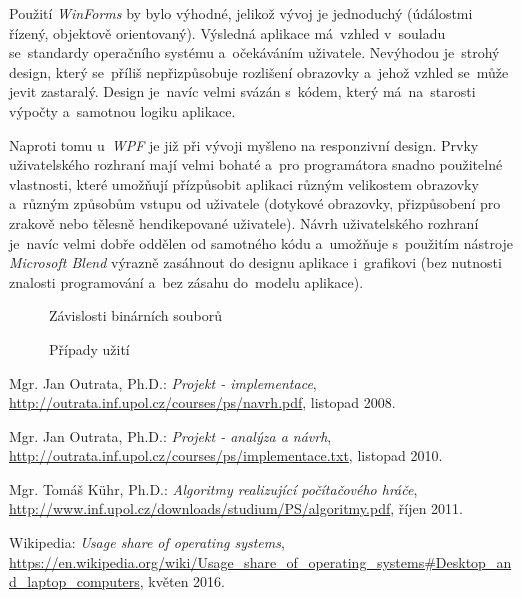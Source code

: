 \documentclass[12pt]{article}
\begin{document}
Použití \emph{WinForms} by bylo výhodné, jelikož vývoj je jednoduchý (údálostmi řízený, objektově orientovaný). Výsledná aplikace má~vzhled v~souladu se~standardy operačního systému a~očekáváním uživatele. Nevýhodou je~strohý design, který se~příliš nepřizpůsobuje rozlišení obrazovky a~jehož vzhled se~může jevit zastaralý. Design je~navíc velmi svázán s~kódem, který má~na~starosti výpočty a~samotnou logiku aplikace.

Naproti tomu u~\emph{WPF} je již při vývoji myšleno na responzivní design. Prvky uživatelského rozhraní mají velmi bohaté a~pro programátora snadno použitelné vlastnosti, které umožňují přízpůsobit aplikaci různým velikostem obrazovky a~různým způsobům vstupu od uživatele (dotykové obrazovky, přizpůsobení pro zrakově nebo tělesně hendikepované uživatele). Návrh uživatelského rozhraní je~navíc velmi dobře oddělen od samotného kódu a~umožňuje s~použitím nástroje \emph{Microsoft Blend} výrazně zasáhnout do designu aplikace i~grafikovi (bez nutnosti znalosti programování a~bez zásahu do~modelu aplikace).

\begin{figure}[ht]
	\epsfysize=60mm
	\caption{Závislosti binárních souborů}
	\label{Assemblies}
\end{figure}

\begin{figure}[ht]
	\epsfysize=200mm
	\caption{Případy užití}
	\label{PrimaryUseCases}
\end{figure}

\newpage
\begin{thebibliography}{10}

	
 Mgr. Jan Outrata, Ph.D.: \emph{Projekt - implementace},
 \url{http://outrata.inf.upol.cz/courses/ps/navrh.pdf},
			listopad 2008.

	
 Mgr. Jan Outrata, Ph.D.: \emph{Projekt - analýza a návrh},
 \url{http://outrata.inf.upol.cz/courses/ps/implementace.txt},
			listopad 2010.

 Mgr. Tomáš Kühr, Ph.D.: \emph{Algoritmy realizující počítačového hráče},
 \url{http://www.inf.upol.cz/downloads/studium/PS/algoritmy.pdf},
			říjen 2011.

Wikipedia: \emph{Usage share of operating systems},
 \url{https://en.wikipedia.org/wiki/Usage_share_of_operating_systems#Desktop_and_laptop_computers},
			květen 2016.

\end{thebibliography} 
\end{document}
